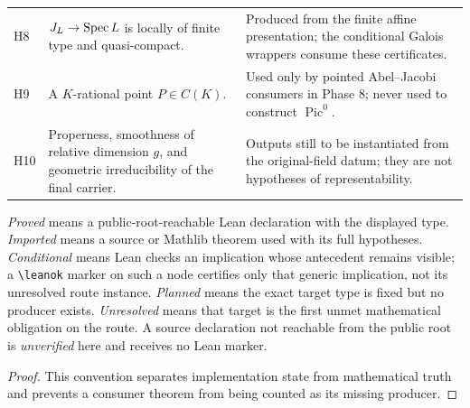 \begin{center}
\begin{tabular}{p{}p{}p{}}
H8 & \(J_L\to\operatorname{Spec} L\) is locally of finite type and quasi-compact. & Produced
from the finite affine presentation; the conditional Galois wrappers consume
these certificates.\\
H9 & A \(K\)-rational point \(P\in C(K)\). & Used only by pointed Abel--Jacobi
consumers in Phase 8; never used to construct \(\operatorname{Pic}^0\).\\
H10 & Properness, smoothness of relative dimension \(g\), and geometric
irreducibility of the final carrier. & Outputs still to be instantiated from
the original-field datum; they are not hypotheses of representability.\\
\end{tabular}
\end{center}

\begin{remark}
  \label{route-rem-status}

  \emph{Proved} means a public-root-reachable Lean declaration with the
  displayed type.  \emph{Imported} means a source or Mathlib theorem used with
  its full hypotheses.  \emph{Conditional} means Lean checks an implication
  whose antecedent remains visible; a \texttt{\textbackslash leanok} marker on
  such a node certifies only that generic implication, not its unresolved route
  instance.  \emph{Planned} means the exact target type is fixed but no
  producer exists.  \emph{Unresolved} means that target is the first unmet
  mathematical obligation on the route.  A source declaration not reachable
  from the public root is \emph{unverified} here and receives no Lean marker.
\end{remark}

\begin{proof}
  This convention separates implementation state from mathematical truth and
  prevents a consumer theorem from being counted as its missing producer.
\end{proof}
